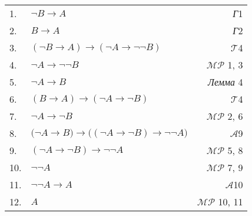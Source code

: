 \documentclass{article}
\begin{document}
\begin{enumerate}
\begin{tabular}{llr}
1. & $\neg B\rightarrow A$ & \textit{Г}1\\
2. & $B\rightarrow A$ & \textit{Г}2\\
3. & $\left(\neg B\rightarrow A\right)\rightarrow\left(\neg A\rightarrow\neg\neg B\right)$ & $\mathcal{T}$4\\
4. & $\neg A\rightarrow\neg\neg B$ & $\mathcal{MP}$ 1, 3\\
5. & $\neg A\rightarrow B$ & \textit{Лемма} 4\\
6. & $\left(B\rightarrow A\right)\rightarrow\left(\neg A\rightarrow\neg B\right)$ & $\mathcal{T}$4\\
7. & $\neg A\rightarrow\neg B$ & $\mathcal{MP}$ 2, 6\\
8. & $\bigl(\neg A\rightarrow B\bigr)\rightarrow\bigl(\left(\neg A\rightarrow\neg B\right)\rightarrow\neg\neg A\bigr)$ & $\mathcal{A}$9\\
9. & $\left(\neg A\rightarrow\neg B\right)\rightarrow\neg\neg A$ & $\mathcal{MP}$ 5, 8\\
10. & $\neg\neg A$ & $\mathcal{MP}$ 7, 9\\
11. & $\neg\neg A\rightarrow A$ & $\mathcal{A}$10\\
12. & $A$ & $\mathcal{MP}$ 10, 11
\end{tabular}

\end{enumerate}
\end{document}
